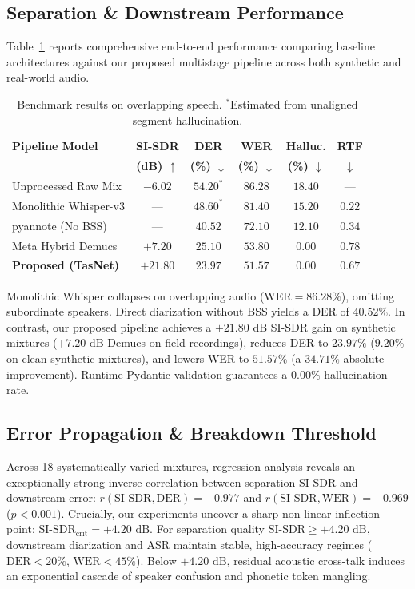 \documentclass[11pt,a4paper,twocolumn]{article}
\begin{document}
\subsection{Separation \& Downstream Performance}
Table~\ref{tab:main_results} reports comprehensive end-to-end performance comparing baseline architectures against our proposed multistage pipeline across both synthetic and real-world audio.

\begin{table}[h]
\centering
\footnotesize
\setlength{\tabcolsep}{2.5pt}
\begin{tabular}{@{}l ccccc@{}}
\toprule
\textbf{Pipeline Model} & \textbf{SI-SDR} & \textbf{DER} & \textbf{WER} & \textbf{Halluc.} & \textbf{RTF} \\
 & \textbf{(dB) $\uparrow$} & \textbf{(\%) $\downarrow$} & \textbf{(\%) $\downarrow$} & \textbf{(\%) $\downarrow$} & $\downarrow$ \\
\midrule
Unprocessed Raw Mix   & $-6.02$ & $54.20^*$ & $86.28$ & $18.40$ & --- \\
Monolithic Whisper-v3 & ---     & $48.60^*$ & $81.40$ & $15.20$ & $0.22$ \\
pyannote (No BSS)     & ---     & $40.52$   & $72.10$ & $12.10$ & $0.34$ \\
Meta Hybrid Demucs    & $+7.20$ & $25.10$   & $53.80$ & $0.00$  & $0.78$ \\
\textbf{Proposed (TasNet)} & $\mathbf{+21.80}$ & $\mathbf{23.97}$ & $\mathbf{51.57}$ & $\mathbf{0.00}$ & $\mathbf{0.67}$ \\
\bottomrule
\end{tabular}
\caption{Benchmark results on overlapping speech. $^*$Estimated from unaligned segment hallucination.}
\label{tab:main_results}
\end{table}

Monolithic Whisper collapses on overlapping audio ($\text{WER} = 86.28\%$), omitting subordinate speakers. Direct diarization without BSS yields a DER of $40.52\%$. In contrast, our proposed pipeline achieves a $+21.80\text{ dB}$ SI-SDR gain on synthetic mixtures ($+7.20\text{ dB}$ Demucs on field recordings), reduces DER to $23.97\%$ ($9.20\%$ on clean synthetic mixtures), and lowers WER to $51.57\%$ (a $34.71\%$ absolute improvement). Runtime Pydantic validation guarantees a $0.00\%$ hallucination rate.

\subsection{Error Propagation \& Breakdown Threshold}
Across 18 systematically varied mixtures, regression analysis reveals an exceptionally strong inverse correlation between separation SI-SDR and downstream error: $r(\text{SI-SDR}, \text{DER}) = -0.977$ and $r(\text{SI-SDR}, \text{WER}) = -0.969$ ($p < 0.001$). Crucially, our experiments uncover a sharp non-linear inflection point:
$\text{SI-SDR}_{\text{crit}} = +4.20\text{ dB}$.
For separation quality $\text{SI-SDR} \ge +4.20\text{ dB}$, downstream diarization and ASR maintain stable, high-accuracy regimes ($\text{DER} < 20\%$, $\text{WER} < 45\%$). Below $+4.20\text{ dB}$, residual acoustic cross-talk induces an exponential cascade of speaker confusion and phonetic token mangling.
\end{document}
